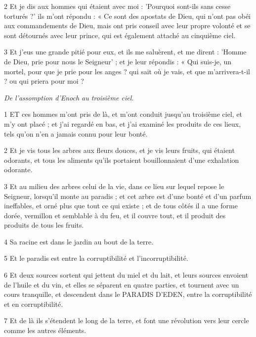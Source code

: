 \par 2 Et je dis aux hommes qui étaient avec moi : 'Pourquoi sont-ils sans cesse torturés ?' ils m'ont répondu : « Ce sont des apostats de Dieu, qui n'ont pas obéi aux commandements de Dieu, mais ont pris conseil avec leur propre volonté et se sont détournés avec leur prince, qui est également attaché au cinquième ciel.

\par 3 Et j'eus une grande pitié pour eux, et ils me saluèrent, et me dirent : 'Homme de Dieu, prie pour nous le Seigneur' ; et je leur répondis : « Qui suis-je, un mortel, pour que je prie pour les anges ? qui sait où je vais, et que m'arrivera-t-il ? ou qui priera pour moi ?


\par \textit{De l'assomption d'Enoch au troisième ciel.}

\par 1 ET ces hommes m'ont pris de là, et m'ont conduit jusqu'au troisième ciel, et m'y ont placé ; et j'ai regardé en bas, et j'ai examiné les produits de ces lieux, tels qu'on n'en a jamais connu pour leur bonté.

\par 2 Et je vis tous les arbres aux fleurs douces, et je vis leurs fruits, qui étaient odorants, et tous les aliments qu'ils portaient bouillonnaient d'une exhalation odorante.

\par 3 Et au milieu des arbres celui de la vie, dans ce lieu sur lequel repose le Seigneur, lorsqu'il monte au paradis ; et cet arbre est d'une bonté et d'un parfum ineffables, et orné plus que tout ce qui existe ; et de tous côtés il a une forme dorée, vermillon et semblable à du feu, et il couvre tout, et il produit des produits de tous les fruits.

\par 4 Sa racine est dans le jardin au bout de la terre.

\par 5 Et le paradis est entre la corruptibilité et l'incorruptibilité.

\par 6 Et deux sources sortent qui jettent du miel et du lait, et leurs sources envoient de l'huile et du vin, et elles se séparent en quatre parties, et tournent avec un cours tranquille, et descendent dans le PARADIS D'EDEN, entre la corruptibilité et en corruptibilité.

\par 7 Et de là ils s'étendent le long de la terre, et font une révolution vers leur cercle comme les autres éléments.

